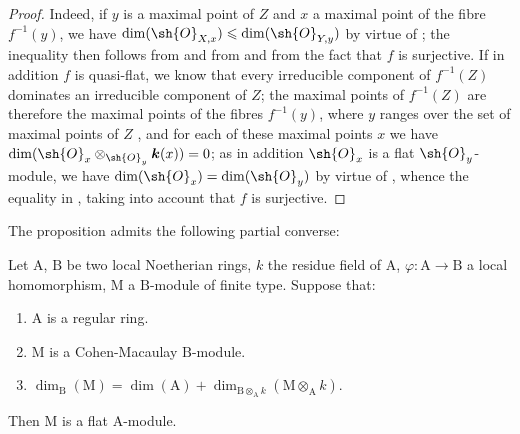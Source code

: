 \begin{proof}
Indeed, if $y$ is a maximal point of $Z$ and $x$ a maximal point of the fibre $f^{-1}(y)$, we have $\dim(\sh{O}_{X,x})\leqslant\dim(\sh{O}_{Y,y})$ by virtue of ; the inequality  then follows from  and from  and from the fact that $f$ is surjective.
If in addition $f$ is quasi-flat, we know  that every irreducible component of $f^{-1}(Z)$ dominates an irreducible component of $Z$; the maximal points of $f^{-1}(Z)$ are therefore the maximal points of the fibres $f^{-1}(y)$, where $y$ ranges over the set of maximal points of $Z$ , and for each of these maximal points $x$ we have $\dim(\sh{O}_x\otimes_{\sh{O}_y}\boldsymbol{k}(x))=0$; as in addition $\sh{O}_x$ is a flat $\sh{O}_y$-module, we have $\dim(\sh{O}_x)=\dim(\sh{O}_y)$ by virtue of , whence the equality in , taking into account that $f$ is surjective.
\end{proof}

The proposition  admits the following partial converse:

\begin{proposition}[6.1.5]
\label{IV.6.1.5}
Let $\mathrm{A}$, $\mathrm{B}$ be two local Noetherian rings, $k$ the residue field of $\mathrm{A}$, $\varphi:\mathrm{A}\to\mathrm{B}$ a local homomorphism, $\mathrm{M}$ a $\mathrm{B}$-module of finite type.
Suppose that:
\begin{enumerate}[label=\upshape\arabic{enumi}\textsuperscript{o}]
  \item $\mathrm{A}$ is a regular ring.
  \item $\mathrm{M}$ is a Cohen-Macaulay $\mathrm{B}$-module.
  \item $\dim_\mathrm{B}(\mathrm{M})=\dim(\mathrm{A})+\dim_{\mathrm{B}\otimes_\mathrm{A} k}(\mathrm{M}\otimes_\mathrm{A} k)$.
\end{enumerate}
Then $\mathrm{M}$ is a flat $\mathrm{A}$-module.
\end{proposition}


